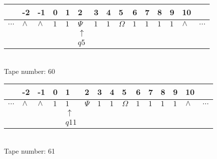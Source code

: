 \documentclass{article}
\begin{document}
\begin{table}[H]
\centering
\begin{tabular}{lllllllllllllll}
 & -2 & -1 & 0 & 1 & 2 & 3 & 4 & 5 & 6 & 7 & 8 & 9 & 10 & \\
\hline
$...$ & \multicolumn{1}{|l|}{$\wedge$} & \multicolumn{1}{|l|}{$\wedge$} & \multicolumn{1}{|l|}{$1$} & \multicolumn{1}{|l|}{$1$} & \multicolumn{1}{|l|}{$\Psi$} & \multicolumn{1}{|l|}{$1$} & \multicolumn{1}{|l|}{$1$} & \multicolumn{1}{|l|}{$\Omega$} & \multicolumn{1}{|l|}{$1$} & \multicolumn{1}{|l|}{$1$} & \multicolumn{1}{|l|}{$1$} & \multicolumn{1}{|l|}{$1$} & \multicolumn{1}{|l|}{$\wedge$} & $...$\\
\hline
&  &  &  &  & $\uparrow$ &  &  &  &  &  &  &  &  &  \\
&  &  &  &  & $ q5 $ &  &  &  &  &  &  &  &  &  \\
\end{tabular}
\\
Tape number: 60
\noindent\makebox[\linewidth]{\hdashrule{\textwidth}{1pt}{1pt}}\end{table}

\begin{table}[H]
\centering
\begin{tabular}{lllllllllllllll}
 & -2 & -1 & 0 & 1 & 2 & 3 & 4 & 5 & 6 & 7 & 8 & 9 & 10 & \\
\hline
$...$ & \multicolumn{1}{|l|}{$\wedge$} & \multicolumn{1}{|l|}{$\wedge$} & \multicolumn{1}{|l|}{$1$} & \multicolumn{1}{|l|}{$1$} & \multicolumn{1}{|l|}{$\Psi$} & \multicolumn{1}{|l|}{$1$} & \multicolumn{1}{|l|}{$1$} & \multicolumn{1}{|l|}{$\Omega$} & \multicolumn{1}{|l|}{$1$} & \multicolumn{1}{|l|}{$1$} & \multicolumn{1}{|l|}{$1$} & \multicolumn{1}{|l|}{$1$} & \multicolumn{1}{|l|}{$\wedge$} & $...$\\
\hline
&  &  &  & $\uparrow$ &  &  &  &  &  &  &  &  &  &  \\
&  &  &  & $ q11 $ &  &  &  &  &  &  &  &  &  &  \\
\end{tabular}
\\
Tape number: 61
\noindent\makebox[\linewidth]{\hdashrule{\textwidth}{1pt}{1pt}}\end{table}
\end{document}
